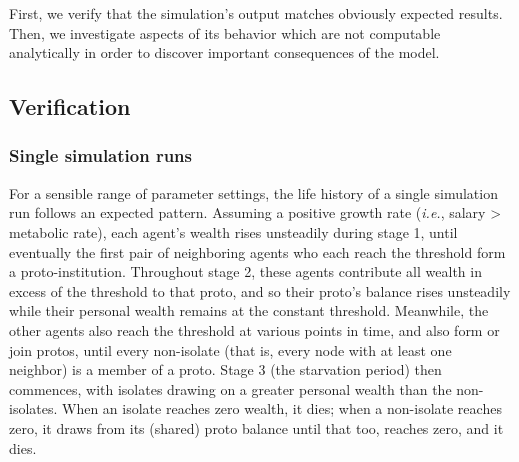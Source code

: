 
First, we verify that the simulation's output matches obviously expected
results. Then, we investigate aspects of its behavior which are not computable
analytically in order to discover important consequences of the model.


\subsection{Verification}

\subsubsection{Single simulation runs}

For a sensible range of parameter settings, the life history of a single
simulation run follows an expected pattern. Assuming a positive growth rate
(\textit{i.e.}, salary > metabolic rate), each agent's wealth rises unsteadily
during stage 1, until eventually the first pair of neighboring agents who each
reach the threshold form a proto-institution. Throughout stage 2, these agents
contribute all wealth in excess of the threshold to that proto, and so their
proto's balance rises unsteadily while their personal wealth remains at the
constant threshold. Meanwhile, the other agents also reach the threshold at
various points in time, and also form or join protos, until every non-isolate
(that is, every node with at least one neighbor) is a member of a proto. Stage
3 (the starvation period) then commences, with isolates drawing on a greater
personal wealth than the non-isolates. When an isolate reaches zero wealth, it
dies; when a non-isolate reaches zero, it draws from its (shared) proto balance
until that too, reaches zero, and it dies.

